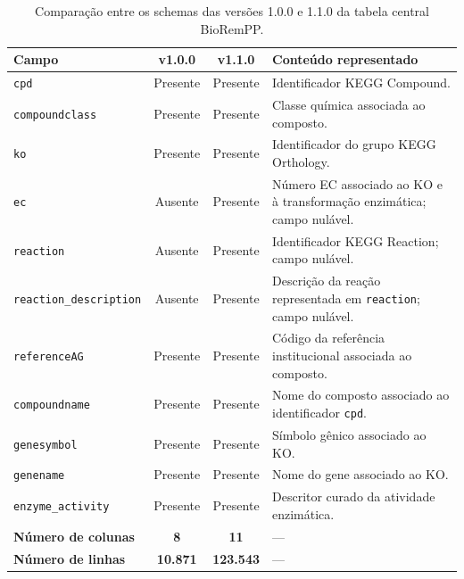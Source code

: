 \begin{table}[htbp]
\centering
\caption{Comparação entre os schemas das versões 1.0.0 e 1.1.0 da tabela
central BioRemPP.}
\label{tab:c1-schema-comparison}
\footnotesize
\begin{tabularx}{\textwidth}{@{}lccX@{}}
\toprule
\textbf{Campo}
& \textbf{v1.0.0}
& \textbf{v1.1.0}
& \textbf{Conteúdo representado} \\
\midrule

\texttt{cpd}
& Presente
& Presente
& Identificador KEGG Compound. \\

\texttt{compoundclass}
& Presente
& Presente
& Classe química associada ao composto. \\

\texttt{ko}
& Presente
& Presente
& Identificador do grupo KEGG Orthology. \\

\texttt{ec}
& Ausente
& Presente
& Número EC associado ao KO e à transformação enzimática; campo nulável. \\

\texttt{reaction}
& Ausente
& Presente
& Identificador KEGG Reaction; campo nulável. \\

\texttt{reaction\_description}
& Ausente
& Presente
& Descrição da reação representada em \texttt{reaction}; campo nulável. \\

\texttt{referenceAG}
& Presente
& Presente
& Código da referência institucional associada ao composto. \\

\texttt{compoundname}
& Presente
& Presente
& Nome do composto associado ao identificador \texttt{cpd}. \\

\texttt{genesymbol}
& Presente
& Presente
& Símbolo gênico associado ao KO. \\

\texttt{genename}
& Presente
& Presente
& Nome do gene associado ao KO. \\

\texttt{enzyme\_activity}
& Presente
& Presente
& Descritor curado da atividade enzimática. \\

\midrule

\textbf{Número de colunas}
& \textbf{8}
& \textbf{11}
& --- \\

\textbf{Número de linhas}
& \textbf{10.871}
& \textbf{123.543}
& --- \\

\bottomrule
\end{tabularx}
\end{table}

